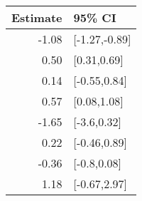 \begin{tabular}{rl}
  \hline
Estimate & 95\% CI \\ 
  \hline
-1.08 & [-1.27,-0.89] \\ 
  0.50 & [0.31,0.69] \\ 
  0.14 & [-0.55,0.84] \\ 
  0.57 & [0.08,1.08] \\ 
  -1.65 & [-3.6,0.32] \\ 
  0.22 & [-0.46,0.89] \\ 
  -0.36 & [-0.8,0.08] \\ 
  1.18 & [-0.67,2.97] \\ 
   \hline
\end{tabular}

